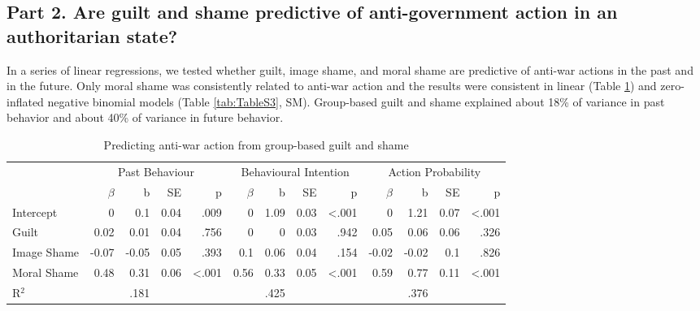 \documentclass[
]{article}
\begin{document}
\hypertarget{part-2.-are-guilt-and-shame-predictive-of-anti-government-action-in-an-authoritarian-state}{%
\subsection*{Part 2. Are guilt and shame predictive of anti-government action in an authoritarian state?}\label{part-2.-are-guilt-and-shame-predictive-of-anti-government-action-in-an-authoritarian-state}}

In a series of linear regressions, we tested whether guilt, image shame, and moral shame are predictive of anti-war actions in the past and in the future. Only moral shame was consistently related to anti-war action and the results were consistent in linear (Table \ref{tab:Table2}) and zero-inflated negative binomial models (Table \ref{tab:TableS3}, SM). Group-based guilt and shame explained about 18\% of variance in past behavior and about 40\% of variance in future behavior.

\begin{table}[H]

\caption{\label{tab:Table2}Predicting anti-war action from group-based guilt and shame}
\centering
\fontsize{8}{10}\selectfont
\begin{tabular}[t]{lrrrrrrrrrrrr}
\toprule
\multicolumn{1}{c}{} & \multicolumn{4}{c}{Past Behaviour} & \multicolumn{4}{c}{Behavioural Intention} & \multicolumn{4}{c}{Action Probability} \\
\cmidrule(l{3pt}r{3pt}){2-5} \cmidrule(l{3pt}r{3pt}){6-9} \cmidrule(l{3pt}r{3pt}){10-13}
  & $\beta$ & b & SE & p & $\beta$ & b & SE & p & $\beta$ & b & SE & p\\
\midrule
Intercept & 0 & 0.1 & 0.04 & .009 & 0 & 1.09 & 0.03 & <.001 & 0 & 1.21 & 0.07 & <.001\\
Guilt & 0.02 & 0.01 & 0.04 & .756 & 0 & 0 & 0.03 & .942 & 0.05 & 0.06 & 0.06 & .326\\
Image Shame & -0.07 & -0.05 & 0.05 & .393 & 0.1 & 0.06 & 0.04 & .154 & -0.02 & -0.02 & 0.1 & .826\\
Moral Shame & 0.48 & 0.31 & 0.06 & <.001 & 0.56 & 0.33 & 0.05 & <.001 & 0.59 & 0.77 & 0.11 & <.001\\
\midrule
R$^{2}$ &  & .181 &  &  &  & .425 &  &  &  & .376 &  & \\
\bottomrule
\end{tabular}
\end{table}
\end{document}
